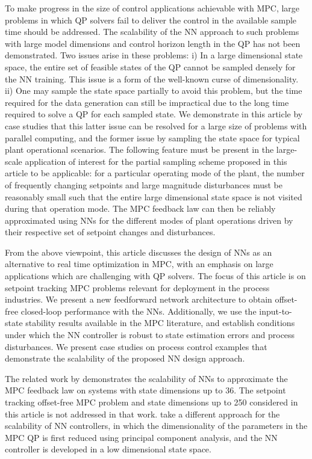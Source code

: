 \documentclass[preprint,5p, twocolumn, authoryear]{elsarticle}
\begin{document}
To make progress in the size of control applications 
achievable with MPC, large problems
in which QP solvers fail to deliver the 
control in the available sample time should be addressed.
The scalability of the NN approach
to such problems with large model dimensions and 
control horizon length in the QP
has not been demonstrated. Two issues arise 
in these problems:
i) In a large dimensional state space,   
the entire set of feasible states of the QP cannot be sampled  
densely for the NN training. This issue is 
a form of the well-known curse of dimensionality.
ii) One may sample the state space partially
to avoid this problem, but the time required for the 
data generation can still be impractical
due to the long time required to solve a QP 
for each sampled state. 
We demonstrate in this article by case studies that
this latter issue can be resolved for a large size 
of problems with parallel 
computing, and the former issue by sampling the 
state space for typical plant operational scenarios.
The following feature must be present in the large-scale
application of interest for the partial sampling scheme 
proposed in this article to be applicable:
for a particular operating mode of the plant, 
the number of frequently changing setpoints
and large magnitude disturbances 
must be reasonably small 
such that the entire large
dimensional state space is not visited during that
operation mode. 
The MPC feedback law 
can then be reliably approximated using NNs
for the different modes of plant operations driven by  
their respective set
of setpoint changes and disturbances.

From the above viewpoint, 
this article discusses the design of NNs
as an alternative to real time optimization in MPC, 
with an emphasis on large applications which 
are challenging with QP solvers. 
The focus of this article is on setpoint tracking 
MPC problems relevant for deployment in the process industries.
We present a new feedforward network architecture to obtain
offset-free closed-loop performance with the NNs.
Additionally, we use the input-to-state
stability results
available in the MPC literature, and establish
conditions under which the NN controller 
is robust to state estimation errors and process 
disturbances. We present case studies 
on process control examples that
demonstrate the scalability of the proposed NN design 
approach.

The related work by \cite*{chen:wang:atanasov:kumar:morari:2019}
demonstrates the scalability of NNs 
to approximate the MPC feedback law on systems with 
state dimensions up to 36. The setpoint 
tracking offset-free MPC problem and state 
dimensions up to 250 considered in this 
article is not addressed in that work. 
\cite*{drgona:picard:kvasnica:helsen:2018}
take a different approach for the scalability
of NN controllers, in which 
the dimensionality of the parameters in the MPC QP is first 
reduced using principal component analysis, and the 
NN controller is developed in a low dimensional state space.
\end{document}
